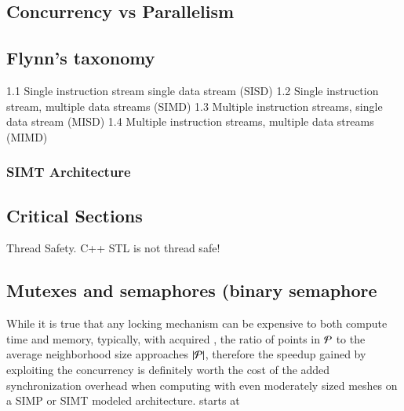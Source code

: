 {{%
\subsection{Concurrency vs Parallelism}

%
\subsection{Flynn's taxonomy}
1.1	Single instruction stream single data stream (SISD)
1.2	Single instruction stream, multiple data streams (SIMD)
1.3	Multiple instruction streams, single data stream (MISD)
1.4	Multiple instruction streams, multiple data streams (MIMD)

\subsubsection{SIMT Architecture}%
%
\subsection{Critical Sections}
\label{ch2sPPssCS}
Thread Safety. C++ STL is not thread safe!

%
\subsection{Mutexes and semaphores (binary semaphore}
\label{ch2sPPssMS}
While it is true that any locking mechanism can be expensive to both compute time and memory,  typically, with acquired \tdd{}, the ratio of points in $\mathcal{P}$ to the average neighborhood size  approaches $|\mathcal{P}|$, therefore the speedup gained by exploiting the concurrency is definitely worth the cost of the added synchronization overhead when computing with even moderately sized meshes on a SIMP or SIMT modeled architecture.
starts at ~\cite[~p.20]{Lang17}

%
}}

